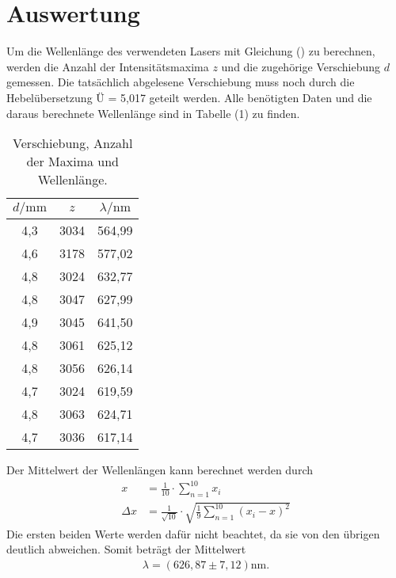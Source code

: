 \section{Auswertung}
\label{sec:Auswertung}

Um die Wellenlänge des verwendeten Lasers mit Gleichung () zu berechnen, werden die Anzahl der Intensitätsmaxima $z$ und die zugehörige Verschiebung $d$ gemessen.
Die tatsächlich abgelesene Verschiebung muss noch durch die Hebelübersetzung Ü = 5,017 geteilt werden. 
Alle benötigten Daten und die daraus berechnete Wellenlänge sind in Tabelle (1) zu finden.
\begin{table}[H]
\centering
\caption{Verschiebung, Anzahl der Maxima und Wellenlänge.}
\label{tab:einzel1}
\begin{tabular}{c c c}
\toprule
$d/\si{\milli\meter}$ & $z$ & $\lambda/\si{\nano\meter}$\\
\midrule
4,3 & 3034 & 564,99 \\
4,6 & 3178 & 577,02 \\
4,8 & 3024 & 632,77 \\
4,8 & 3047 & 627,99 \\
4,9 & 3045 & 641,50 \\
4,8 & 3061 & 625,12 \\
4,8 & 3056 & 626,14 \\
4,7 & 3024 & 619,59 \\
4,8 & 3063 & 624,71 \\
4,7 & 3036 & 617,14 \\
\bottomrule
\end{tabular}
\end{table}

Der Mittelwert der Wellenlängen kann berechnet werden durch
\begin{align*}
x &= \frac{1}{10}\cdot \sum_{n=1}^{10} x_i\\
\Delta x &=\frac{1}{\sqrt{10}} \cdot \sqrt{\frac{1}{9} \sum_{n=1}^{10} (x_i - x)^2} 
\end{align*}
Die ersten beiden Werte werden dafür nicht beachtet, da sie von den übrigen deutlich abweichen. Somit beträgt der Mittelwert 
\begin{align*}
\lambda = (626,87 \pm 7,12) \si{\nano\meter} .
\end{align*}

